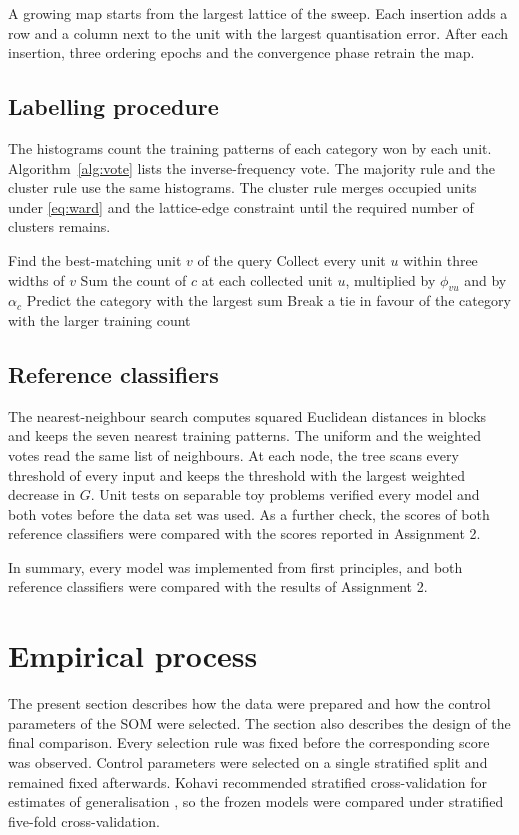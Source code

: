 \documentclass[conference,10pt]{IEEEtran}
\begin{document}
A growing map starts from the largest lattice of the sweep.
Each insertion adds a row and a column next to the unit with the largest quantisation error.
After each insertion, three ordering epochs and the convergence phase retrain the map.

\subsection{Labelling procedure}
The histograms count the training patterns of each category won by each unit.
Algorithm~\ref{alg:vote} lists the inverse-frequency vote.
The majority rule and the cluster rule use the same histograms.
The cluster rule merges occupied units under \eqref{eq:ward} and the lattice-edge constraint until the required number of clusters remains.

\begin{algorithm}[tb]
\caption{Inverse-frequency neighbourhood vote}
\label{alg:vote}
\begin{algorithmic}[1]
\State Find the best-matching unit $v$ of the query
\State Collect every unit $u$ within three widths of $v$
  \State Sum the count of $c$ at each collected unit $u$, multiplied by $\phi_{vu}$ and by $\alpha_c$
\EndFor
\State Predict the category with the largest sum
\State Break a tie in favour of the category with the larger training count
\end{algorithmic}
\end{algorithm}

\subsection{Reference classifiers}
The nearest-neighbour search computes squared Euclidean distances in blocks and keeps the seven nearest training patterns.
The uniform and the weighted votes read the same list of neighbours.
At each node, the tree scans every threshold of every input and keeps the threshold with the largest weighted decrease in $G$.
Unit tests on separable toy problems verified every model and both votes before the data set was used.
As a further check, the scores of both reference classifiers were compared with the scores reported in Assignment 2.

In summary, every model was implemented from first principles, and both reference classifiers were compared with the results of Assignment 2.

\section{Empirical process}
\label{sec:empirical}
The present section describes how the data were prepared and how the control parameters of the SOM were selected.
The section also describes the design of the final comparison.
Every selection rule was fixed before the corresponding score was observed.
Control parameters were selected on a single stratified split and remained fixed afterwards.
Kohavi recommended stratified cross-validation for estimates of generalisation \cite{kohavi1995}, so the frozen models were compared under stratified five-fold cross-validation.
\end{document}
